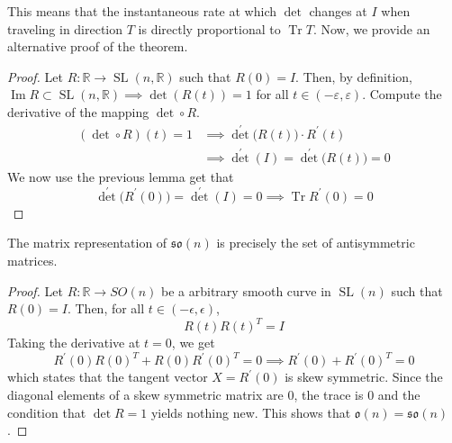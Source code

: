 \documentclass{article}
\DeclareMathOperator{\Tr}{Tr}
\DeclareMathOperator{\im}{Im}
\DeclareMathOperator{\SL}{SL}
\begin{document}
    This means that the instantaneous rate at which $\det$ changes at $I$ when traveling in direction $T$ is directly proportional to $\Tr{T}$. Now, we provide an alternative proof of the theorem. 
    \begin{proof}
      Let $R: \mathbb{R} \longrightarrow \SL(n, \mathbb{R})$ such that $R(0) = I$. Then, by definition, $\im{R} \subset \SL(n, \mathbb{R}) \implies \det{(R(t))} = 1$ for all $t \in (-\varepsilon, \varepsilon)$. Compute the derivative of the mapping $\det \circ R$. 
      \begin{align*}
          (\det \circ  R) (t) = 1 & \implies \det^\prime \big( R(t) \big) \cdot R^\prime (t) \\ 
          & \implies \det^\prime (I) = \det^\prime \big(R(t)\big) = 0 
      \end{align*}
      We now use the previous lemma get that 
      \begin{equation}
        \det^\prime \big( R^\prime(0)\big) = \det^\prime (I)=0 \implies \Tr{R^\prime(0)} = 0
      \end{equation}
    \end{proof} 

    \begin{theorem}
      The matrix representation of $\mathfrak{so}(n)$ is precisely the set of antisymmetric matrices. 
    \end{theorem}
    \begin{proof}
      Let $R: \mathbb{R} \longrightarrow SO(n)$ be a arbitrary smooth curve in $\SL(n)$ such that $R(0) = I$. Then, for all $t \in (-\epsilon, \epsilon)$, 
      \begin{equation}
        R(t) R(t)^T = I
      \end{equation}
      Taking the derivative at $t = 0$, we get
      \begin{equation}
        R^\prime (0) R(0)^T + R(0) R^\prime(0)^T = 0 \implies R^\prime (0) + R^\prime(0)^T = 0
      \end{equation}
      which states that the tangent vector $X = R^\prime (0)$ is skew symmetric. Since the diagonal elements of a skew symmetric matrix are $0$, the trace is $0$ and the condition that $\det{R} = 1$ yields nothing new. This shows that $\mathfrak{o}(n) = \mathfrak{so}(n)$. 
    \end{proof}
\end{document}
